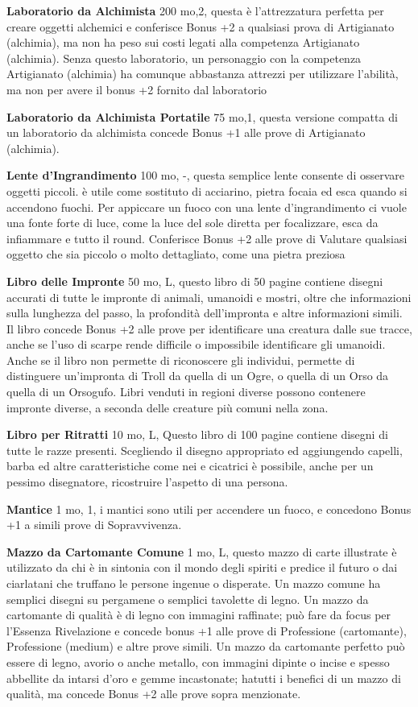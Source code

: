 \documentclass[a4paper,11pt,twoside,openany]{book}
\begin{document}
{\textbf{Laboratorio da Alchimista} 200 mo,2,  questa è l'attrezzatura perfetta per creare oggetti alchemici e conferisce Bonus +2 a qualsiasi prova di Artigianato (alchimia), ma non ha peso sui costi legati alla competenza Artigianato (alchimia). 
Senza questo laboratorio, un personaggio con la competenza Artigianato (alchimia) ha comunque abbastanza attrezzi per utilizzare l'abilità, ma non per avere il bonus +2 fornito dal laboratorio

\textbf{Laboratorio da Alchimista Portatile} 75 mo,1, questa versione compatta di un laboratorio da alchimista concede Bonus +1 alle prove di Artigianato (alchimia).

\textbf{Lente d'Ingrandimento} 100 mo, -, questa semplice lente consente di osservare oggetti piccoli. è utile come sostituto di acciarino, pietra focaia ed esca quando si accendono fuochi. 
Per appiccare un fuoco con una lente d'ingrandimento ci vuole una fonte forte di luce, come la luce del sole diretta per focalizzare, esca da infiammare e tutto il round. Conferisce Bonus +2 alle prove di Valutare qualsiasi oggetto che sia piccolo o molto dettagliato, come una pietra preziosa 

\textbf{Libro delle Impronte} 50 mo, L,  questo libro di 50 pagine contiene disegni accurati di tutte le impronte di animali, umanoidi e mostri, oltre che informazioni sulla lunghezza del passo, la profondità dell'impronta e altre informazioni simili. Il libro concede Bonus +2 alle prove per identificare una creatura dalle sue tracce, anche se l'uso di scarpe rende difficile o impossibile identificare gli umanoidi. 
Anche se il libro non permette di riconoscere gli individui, permette di distinguere un'impronta di Troll da quella di un Ogre, o quella di un Orso da quella di un Orsogufo. Libri venduti in regioni diverse possono contenere impronte diverse, a seconda delle creature più comuni nella zona.

\textbf{Libro per Ritratti} 10 mo, L,  Questo libro di 100 pagine contiene disegni di tutte le razze presenti. Scegliendo il disegno appropriato ed aggiungendo capelli, barba ed altre caratteristiche come nei e cicatrici è possibile, anche per un pessimo disegnatore, ricostruire l'aspetto di una persona.

\textbf{Mantice} 1 mo, 1, i mantici sono utili per accendere un fuoco, e concedono Bonus +1 a simili prove di Sopravvivenza.

\textbf{Mazzo da Cartomante Comune} 1 mo, L, questo mazzo di carte illustrate è utilizzato da chi è in sintonia con il mondo degli spiriti e predice il futuro o dai ciarlatani che truffano le persone ingenue o disperate. Un mazzo comune ha semplici disegni su pergamene o semplici tavolette di legno. 
Un mazzo da cartomante di qualità è di legno con immagini raffinate; può fare da focus per l'Essenza Rivelazione e concede bonus +1 alle prove di Professione (cartomante), Professione (medium) e altre prove simili. 
Un mazzo da cartomante perfetto può essere di legno, avorio o anche metallo, con immagini dipinte o incise e spesso abbellite da intarsi d'oro e gemme incastonate; hatutti i benefici di un mazzo di qualità, ma concede Bonus +2 alle prove sopra menzionate.

}
\end{document}

